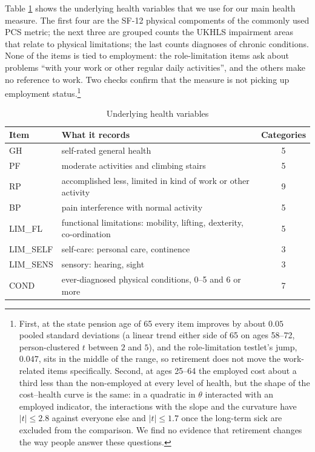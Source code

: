 \documentclass[11pt]{article}
\begin{document}
	Table \ref{tab:health_vars} shows the underlying health variables that we use for our main health measure. The first four are the SF-12 physical compoments of the commonly used PCS metric; the next three are grouped counts the UKHLS impairment areas that relate to physical limitations; the last counts diagnoses of chronic conditions. None of the items is tied to employment: the role-limitation items ask about problems ``with your work or other regular daily activities'', and the others make no reference to work. Two checks confirm that the measure is not picking up employment status.\footnote{First, at the state pension age of 65 every item improves by about $0.05$ pooled standard deviations (a linear trend either side of 65 on ages 58--72, person-clustered $t$ between $2$ and $5$), and the role-limitation testlet's jump, $0.047$, sits in the middle of the range, so retirement does not move the work-related items specifically. Second, at ages 25--64 the employed cost about a third less than the non-employed at every level of health, but the shape of the cost--health curve is the same: in a quadratic in $\theta$ interacted with an employed indicator, the interactions with the slope and the curvature have $|t| \le 2.8$ against everyone else and $|t| \le 1.7$ once the long-term sick are excluded from the comparison. We find no evidence that retirement changes the way people answer these questions.}
	
	\begin{table}[H]
		\caption{Underlying health variables}
		\label{tab:health_vars}
		\centering
		\begin{tabular}{llc}
			\toprule
			Item & What it records & Categories \\
			\midrule
			GH & self-rated general health & 5 \\
			PF & moderate activities and climbing stairs & 5 \\
			RP & accomplished less, limited in kind of work or other activity & 9 \\
			BP & pain interference with normal activity & 5 \\
			LIM\_FL & functional limitations: mobility, lifting, dexterity, co-ordination & 5 \\
			LIM\_SELF & self-care: personal care, continence & 3 \\
			LIM\_SENS & sensory: hearing, sight & 3 \\
			COND & ever-diagnosed physical conditions, 0--5 and 6 or more & 7 \\
			\bottomrule
		\end{tabular}
	\end{table}
	
\end{document}
